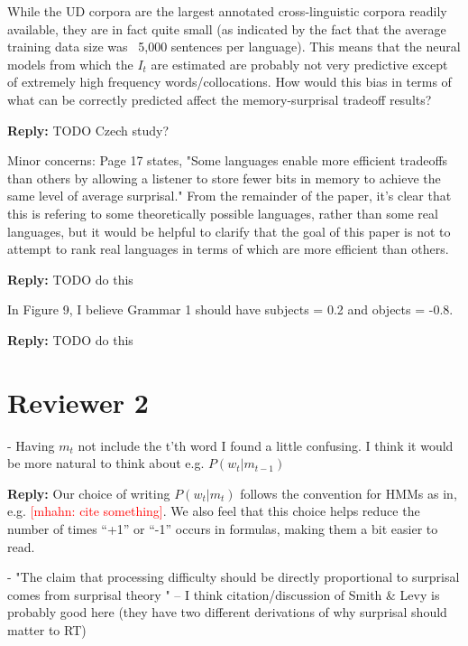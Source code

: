 \documentclass{article}[11pt,a4paper,oneside]
\newcommand\mhahn[1]{\textcolor{red}{[mhahn: #1]}}
\newenvironment{reply}
  {\par\medskip
   \color{blue}%
   \begin{framed}
   \textbf{Reply: }\ignorespaces}
 {\end{framed}
  \medskip}
\begin{document}
While the UD corpora are the largest annotated cross-linguistic corpora readily available, they are in fact quite small (as indicated by the fact that the average training data size was ~5,000 sentences per language). This means that the neural models from which the $I_t$ are estimated are probably not very predictive except of extremely high frequency words/collocations. How would this bias in terms of what can be correctly predicted affect the memory-surprisal tradeoff results?

\begin{reply}
	TODO Czech study?
\end{reply}

Minor concerns:
Page 17 states, "Some languages enable more efficient tradeoffs than others by allowing a listener to store fewer bits in memory to achieve the same level of average surprisal." From the remainder of the paper, it's clear that this is refering to some theoretically possible languages, rather than some real languages, but it would be helpful to clarify that the goal of this paper is not to attempt to rank real languages in terms of which are more efficient than others.

\begin{reply}
	TODO do this
\end{reply}

In Figure 9, I believe Grammar 1 should have subjects = 0.2 and objects = -0.8.

\begin{reply}
	TODO do this
\end{reply}


\section{Reviewer 2}

- Having $m_t$ not include the t'th word I found a little confusing. I think it would be more natural to think about e.g. $P(w_t | m_{t-1})$

\begin{reply}
	Our choice of writing $P(w_t | m_{t})$ follows the convention for HMMs as in, e.g. \mhahn{cite something}.
	We also feel that this choice helps reduce the number of times ``+1'' or ``-1'' occurs in formulas, making them a bit easier to read.
\end{reply}

- "The claim that processing difficulty should be directly proportional to surprisal comes from surprisal theory " -- I think citation/discussion of Smith \& Levy is probably good here (they have two different derivations of why surprisal should matter to RT)
\end{document}
